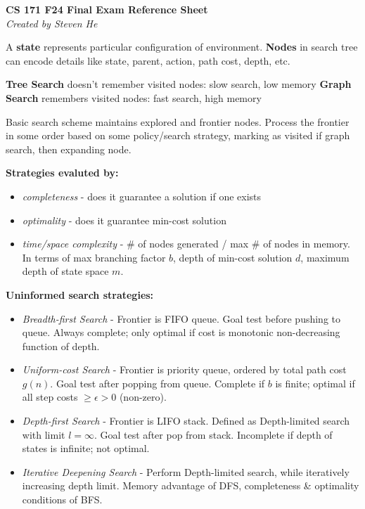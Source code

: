 \documentclass[a4paper,10pt]{article}
\begin{document}
\vspace{-1em}
\begin{center}
    \textbf{\footnotesize CS 171 F24 Final Exam Reference Sheet} \\[-0.5em]
    \textit{\scriptsize Created by Steven He}
\end{center}

\vspace{-1em}

\begin{multicols*}{2}

\begin{tcolorbox}[title=Uninformed Search, module]
    A \textbf{state} represents particular configuration of environment. \textbf{Nodes} in search tree can encode details like state, parent, action, path cost, depth, etc.

    \textbf{Tree Search} doesn't remember visited nodes: slow search, low memory
    \textbf{Graph Search} remembers visited nodes: fast search, high memory

    Basic search scheme maintains explored and frontier nodes. Process the frontier in some order based on some policy/search strategy, marking as visited if graph search, then expanding node.

    \textbf{Strategies evaluted by:}
    \begin{itemize}
        \item \textit{completeness} - does it guarantee a solution if one exists
        \item \textit{optimality} - does it guarantee min-cost solution
        \item \textit{time/space complexity} - \# of nodes generated / max \# of nodes in memory. In terms of max branching factor $b$, depth of min-cost solution $d$, maximum depth of state space $m$.
    \end{itemize}

    \textbf{Uninformed search strategies:}
    \begin{itemize}
        \item \textit{Breadth-first Search} - Frontier is FIFO queue. Goal test before pushing to queue. Always complete; only optimal if cost is monotonic non-decreasing function of depth.
        \item \textit{Uniform-cost Search} - Frontier is priority queue, ordered by total path cost $g(n)$. Goal test after popping from queue. Complete if $b$ is finite; optimal if all step costs $\ge \epsilon > 0$ (non-zero).
        \item \textit{Depth-first Search} - Frontier is LIFO stack. Defined as Depth-limited search with limit $l = \infty$. Goal test after pop from stack. Incomplete if depth of states is infinite; not optimal.
        \item \textit{Iterative Deepening Search} - Perform Depth-limited search, while iteratively increasing depth limit. Memory advantage of DFS, completeness \& optimality conditions of BFS.
    \end{itemize}


\end{tcolorbox}
\end{multicols*}
\end{document}
